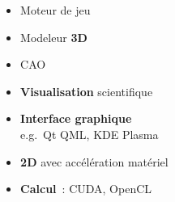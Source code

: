 \begin{frame}
\begin{columns}
\begin{column}{.1\textwidth}
\begin{center}
      \end{center}
    \end{column}
    \begin{column}{.4\textwidth}
      \begin{itemize}
      \item Moteur de jeu %
      \item Modeleur \textbf{3D}
      \item CAO
      \item \textbf{Visualisation} scientifique
      \item \textbf{Interface graphique} \\
        e.g.\ Qt QML, KDE Plasma
      \item \textbf{2D} avec accélération matériel
      \item \textbf{Calcul}~: CUDA, OpenCL
      \end{itemize}
    \end{column}
  \end{columns}
\end{frame}

